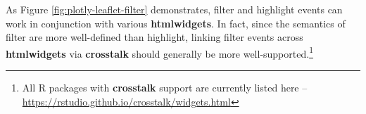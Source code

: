 \documentclass[
  12pt,
]{krantz}
\newenvironment{Shaded}{\begin{snugshade}}{\end{snugshade}}
\newcommand{\DataTypeTok}[1]{\textcolor[rgb]{0.13,0.29,0.53}{#1}}
\newcommand{\DecValTok}[1]{\textcolor[rgb]{0.00,0.00,0.81}{#1}}
\newcommand{\FloatTok}[1]{\textcolor[rgb]{0.00,0.00,0.81}{#1}}
\newcommand{\KeywordTok}[1]{\textcolor[rgb]{0.13,0.29,0.53}{\textbf{#1}}}
\newcommand{\NormalTok}[1]{#1}
\newcommand{\OperatorTok}[1]{\textcolor[rgb]{0.81,0.36,0.00}{\textbf{#1}}}
\newcommand{\StringTok}[1]{\textcolor[rgb]{0.31,0.60,0.02}{#1}}
\begin{document}

As Figure \ref{fig:plotly-leaflet-filter} demonstrates, filter and highlight events can work in conjunction with various \textbf{htmlwidgets}. In fact, since the semantics of filter are more well-defined than highlight, linking filter events across \textbf{htmlwidgets} via \textbf{crosstalk} should generally be more well-supported.\footnote{All R packages with \textbf{crosstalk} support are currently listed here -- \url{https://rstudio.github.io/crosstalk/widgets.html}}

\begin{Shaded}
\end{Shaded}
\end{document}
